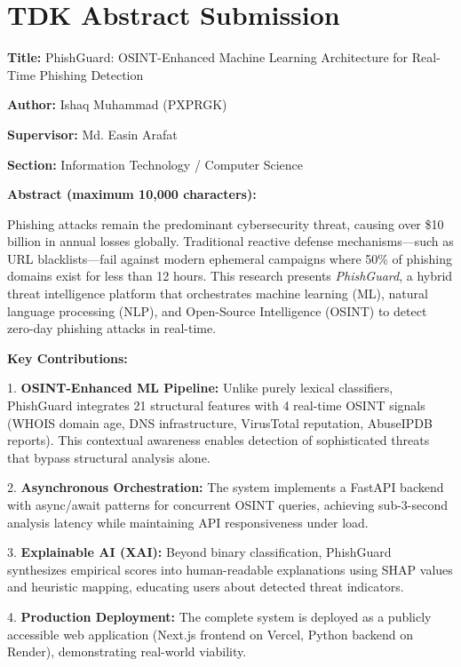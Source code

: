 \section*{TDK Abstract Submission}

\textbf{Title:} PhishGuard: OSINT-Enhanced Machine Learning Architecture for Real-Time Phishing Detection

\textbf{Author:} Ishaq Muhammad (PXPRGK)

\textbf{Supervisor:} Md. Easin Arafat

\textbf{Section:} Information Technology / Computer Science

\vspace{1em}

\textbf{Abstract (maximum 10,000 characters):}

Phishing attacks remain the predominant cybersecurity threat, causing over \$10 billion in annual losses globally. Traditional reactive defense mechanisms---such as URL blacklists---fail against modern ephemeral campaigns where 50\% of phishing domains exist for less than 12 hours. This research presents \textit{PhishGuard}, a hybrid threat intelligence platform that orchestrates machine learning (ML), natural language processing (NLP), and Open-Source Intelligence (OSINT) to detect zero-day phishing attacks in real-time.

\textbf{Key Contributions:}

1. \textbf{OSINT-Enhanced ML Pipeline:} Unlike purely lexical classifiers, PhishGuard integrates 21 structural features with 4 real-time OSINT signals (WHOIS domain age, DNS infrastructure, VirusTotal reputation, AbuseIPDB reports). This contextual awareness enables detection of sophisticated threats that bypass structural analysis alone.

2. \textbf{Asynchronous Orchestration:} The system implements a FastAPI backend with async/await patterns for concurrent OSINT queries, achieving sub-3-second analysis latency while maintaining API responsiveness under load.

3. \textbf{Explainable AI (XAI):} Beyond binary classification, PhishGuard synthesizes empirical scores into human-readable explanations using SHAP values and heuristic mapping, educating users about detected threat indicators.

4. \textbf{Production Deployment:} The complete system is deployed as a publicly accessible web application (Next.js frontend on Vercel, Python backend on Render), demonstrating real-world viability.

